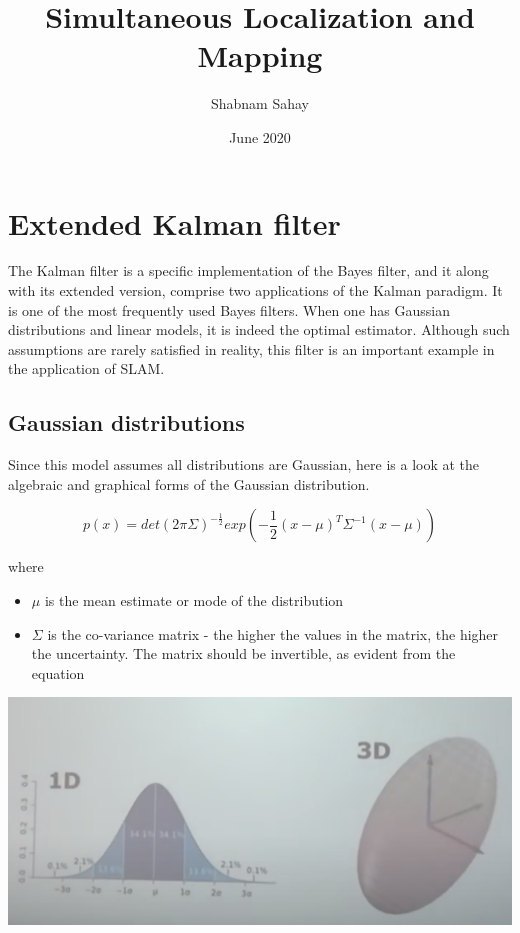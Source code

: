 \documentclass[a4paper]{article}
\title{Simultaneous Localization and Mapping}
\author{Shabnam Sahay}
\date{June 2020}
\begin{document}
\setcounter{section}{3}
\setcounter{page}{24}
\setcounter{MaxMatrixCols}{21}

\section{Extended Kalman filter}

The Kalman filter is a specific implementation of the Bayes filter, and it along with its extended version, comprise two applications of the Kalman paradigm. It is one of the most frequently used Bayes filters. When one has Gaussian distributions and linear models, it is indeed the optimal estimator. Although such assumptions are rarely satisfied in reality, this filter is an important example in the application of SLAM.

\subsection{Gaussian distributions}

Since this model assumes all distributions are Gaussian, here is a look at the algebraic and graphical forms of the Gaussian distribution.

\begin{equation*}
    p(x) = det(2\pi \Sigma)^{-\frac{1}{2}} exp ( - \frac{1}{2} (x-\mu)^T \Sigma^{-1} (x-\mu))
\end{equation*}

where

\begin{itemize}
    \item $\mu$ is the mean estimate or mode of the distribution
    \item $\Sigma$ is the co-variance matrix - the higher the values in the matrix, the higher the uncertainty. The matrix should be invertible, as evident from the equation
\end{itemize}

\begin{center}
    \includegraphics[scale=0.5]{gaussdist}
\end{center}
\end{document}
